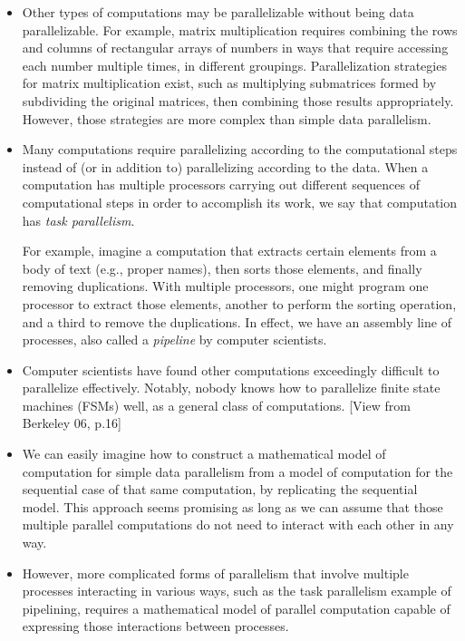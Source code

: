 \documentclass[letterpaper,10pt,openany,oneside]{sphinxmanual}
\begin{document}
\begin{itemize}
\item {} 
Other types of computations may be parallelizable without being data parallelizable. For example, matrix multiplication requires combining the rows and columns of rectangular arrays of numbers in ways that require accessing each number multiple times, in different groupings. Parallelization strategies for matrix multiplication exist, such as multiplying submatrices formed by subdividing the original matrices, then combining those results appropriately. However, those strategies are more complex than simple data parallelism.

\item {} 
Many computations require parallelizing according to the computational steps instead of (or in addition to) parallelizing according to the data. When a computation has multiple processors carrying out different sequences of computational steps in order to accomplish its work, we say that computation has \emph{task parallelism}.

For example, imagine a computation that extracts certain elements from a body of text (e.g., proper names), then sorts those elements, and finally removing duplications. With multiple processors, one might program one processor to extract those elements, another to perform the sorting operation, and a third to remove the duplications. In effect, we have an assembly line of processes, also called a \emph{pipeline} by computer scientists.

\item {} 
Computer scientists have found other computations exceedingly difficult to parallelize effectively. Notably, nobody knows how to parallelize finite state machines (FSMs) well, as a general class of computations. {[}View from Berkeley 06, p.16{]}

\item {} 
We can easily imagine how to construct a mathematical model of computation for simple data parallelism from a model of computation for the sequential case of that same computation, by replicating the sequential model. This approach seems promising as long as we can assume that those multiple parallel computations do not need to interact with each other in any way.

\item {} 
However, more complicated forms of parallelism that involve multiple processes interacting in various ways, such as the task parallelism example of pipelining, requires a mathematical model of parallel computation capable of expressing those interactions between processes.

\end{itemize}
\end{document}
